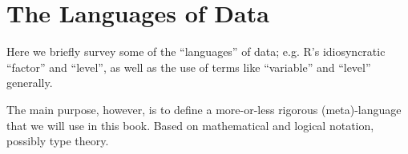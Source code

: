 \chapter{The Languages of Data}

\begin{ednote}
Here we briefly survey some of the ``languages'' of data; e.g. R's
idiosyncratic ``factor'' and ``level'', as well as the use of terms
like ``variable'' and ``level'' generally.

The main purpose, however, is to define a more-or-less rigorous
(meta)-language that we will use in this book.  Based on mathematical
and logical notation, possibly type theory.
\end{ednote}

